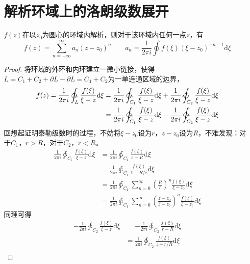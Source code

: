 \documentclass[10pt, a4paper, oneside]{ctexbook}
\def\D{\mathrm{d}}
\newcommand{\F}[1][z]
{\ensuremath{f(#1)}}
\begin{document}
\section{解析环域上的洛朗级数展开}
$\F$在以$z_0$为圆心的环域内解析，则对于该环域内任何一点$z$，有
$$
    \F = \sum_{n=-\infty}^\infty a_n (z-z_0)^n\quad\quad a_n=\frac{1}{2\pi i} \ointctrclockwise \F[\xi](\xi-z_0)^{-n-1}\D \xi
$$
\begin{proof}
    将环域的外环和内环建立一微小链接，使得$L=C_1+C_2+\partial L - \partial L = C_1+C_2$为一单连通区域的边界，
    \begin{align*}
        \F = \frac{1}{2\pi i} \ointctrclockwise_L \frac{\F[\xi]}{\xi-z}\D \xi=\frac{1}{2\pi i} \ointctrclockwise_{C_1} \frac{\F[\xi]}{\xi-z}\D \xi+\frac{1}{2\pi i} \ointclockwise_{C_2} \frac{\F[\xi]}{\xi-z}\D \xi \\
        = \frac{1}{2\pi i} \ointctrclockwise_{C_1} \frac{\F[\xi]}{\xi-z}\D \xi -\frac{1}{2\pi i} \ointctrclockwise_{C_2} \frac{\F[\xi]}{\xi-z}\D \xi                                                                 \\
    \end{align*}
    回想起证明泰勒级数时的过程，不妨将$\xi-z_0$设为$r$，$z-z_0$设为$R$，不难发现：对于$C_1$，$r>R$，对于$C_2$，$r<R$。
    \begin{align*}
        \frac{1}{2\pi i} \ointctrclockwise_{C_1} \frac{\F[\xi]}{\xi-z}\D \xi
         & = \frac{1}{2\pi i} \ointctrclockwise_{C_1} \frac{\F[\xi]}{r-R}\D \xi                                                              \\
         & = \frac{1}{2\pi i} \ointctrclockwise_{C_1} \frac{\F[\xi]}{1-R/r}\D \xi                                                            \\
         & =\frac{1}{2\pi i} \ointctrclockwise_{C_1} \sum_{n=0}^\infty \left(\frac{R}{r}\right)^n  \frac{\F[\xi]}{\xi-z_0} \D \xi            \\
         & =\frac{1}{2\pi i} \ointctrclockwise_{C_1} \sum_{n=0}^\infty  \left(\frac{z-z_0}{\xi-z_0}\right)^n  \frac{\F[\xi]}{\xi-z_0} \D \xi
    \end{align*}
    同理可得
    \begin{align*}
        -\frac{1}{2\pi i} \ointctrclockwise_{C_2} \frac{\F[\xi]}{\xi-z}\D \xi
         & = -\frac{1}{2\pi i} \ointctrclockwise_{C_2} \frac{\F[\xi]}{r-R}\D \xi                                                           \\
         & = \frac{1}{2\pi i} \ointctrclockwise_{C_2} \frac{\F[\xi]}{1-r/R}\D \xi                                                          \\

\end{align*}
\end{proof}
\end{document}
